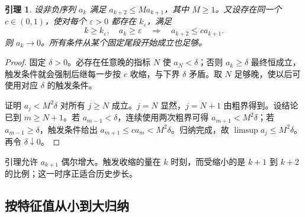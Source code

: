\documentclass[UTF8,zihao=-4,a4paper]{ctexart}
\newtheorem{lemma}[theorem]{引理}
\theoremstyle{definition}\newtheorem{example}[theorem]{例}
\begin{document}
\begin{lemma}\label{lem:scalar}
设非负序列 $a_k$ 满足 $a_{k+2}\le Ma_{k+1}$，其中 $M\ge1$。又设存在同一个 $c\in(0,1)$，使对每个 $\varepsilon>0$ 都存在 $k_\varepsilon$，满足
\[
 k\ge k_\varepsilon,\quad a_k\ge\varepsilon
 \quad\Longrightarrow\quad a_{k+2}\le ca_{k+1}.
\]
则 $a_k\to0$。所有条件从某个固定尾段开始成立也足够。
\end{lemma}
\begin{proof}
固定 $\delta>0$。必存在任意晚的指标 $N$ 使 $a_N<\delta$；否则 $a_k\ge\delta$ 最终恒成立，触发条件就会强制后继每一步按 $c$ 收缩，与下界 $\delta$ 矛盾。取 $N$ 足够晚，使以后可使用对应 $\delta$ 的触发条件。

证明 $a_j<M^2\delta$ 对所有 $j\ge N$ 成立。$j=N$ 显然，$j=N+1$ 由粗界得到。设结论已到 $m\ge N+1$。若 $a_{m-1}<\delta$，连续使用两次粗界可得 $a_{m+1}<M^2\delta$；若 $a_{m-1}\ge\delta$，触发条件给出 $a_{m+1}\le ca_m<M^2\delta$。归纳完成，故 $\limsup a_j\le M^2\delta$。再令 $\delta\downarrow0$。
\end{proof}

引理允许 $a_{k+1}$ 偶尔增大。触发收缩的量在 $k$ 时刻，而受缩小的是 $k+1$ 到 $k+2$ 的比例；这一时序正适合历史步长。

\subsection{按特征值从小到大归纳}
\end{document}
